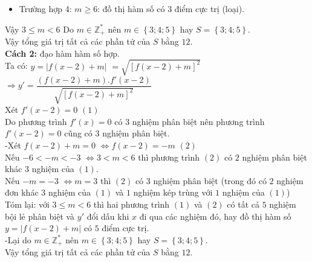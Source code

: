 \begin{ex}
{\begin{itemize}
		\item Trường hợp 4: $m\ge 6$: đồ thị hàm số có $3$ điểm cực trị (loại).
	\end{itemize}
	Vậy $3\le m<6$ Do $m\in\mathbb{Z}_+^*$ nên $m\in\left\{ 3;4;5\right\}$ hay $S=\left\{ 3;4;5\right\}$.\\
	Vậy tổng giá trị tất cả các phần tử của $S$ bằng $12$.\\
	\textbf{Cách 2:} đạo hàm hàm số hợp.\\
	Ta có: $y=\left|f\left(x-2\right)+m\right|$ $=\sqrt{\left[f\left(x-2\right)+m\right]^2}$ $\Rightarrow{y}'=\dfrac{\left(f\left(x-2\right)+m\right).f'\left(x-2\right)}{\sqrt{\left[f\left(x-2\right)+m\right]^2}}$\\
	Xét $f'\left(x-2\right)=0$ $(1)$\\
	Do phương trình $f'(x)=0$ có $3$ nghiệm phân biệt nên phương trình $f'\left(x-2\right)=0$ cũng có $3$ nghiệm phân biệt.\\
	-Xét $f\left(x-2\right)+m=0$ $\Leftrightarrow f\left(x-2\right)=-m$ $(2)$\\
	Nếu $-6<-m<-3$ $\Leftrightarrow 3<m<6$ thì phương trình $(2)$ có $2$ nghiệm phân biệt khác $3$ nghiệm của $(1)$.\\
	Nếu $-m=-3$ $\Leftrightarrow m=3$ thì $(2)$ có $3$ nghiệm phân biệt (trong đó có $2$ nghiệm đơn khác $3$ nghiệm của $(1)$ và $1$ nghiệm kép trùng với $1$ nghiệm của $(1)$)\\
	Tóm lại: với $3\le m<6$ thì hai phương trình $(1)$ và $(2)$ có tất cả $5$ nghiệm bội lẻ phân biệt và $y'$ đổi dấu khi $x$ đi qua các nghiệm đó, hay đồ thị hàm số $y=\left| f\left(x-2\right)+m\right|$ có $5$ điểm cực trị.\\
	-Lại do $m\in\mathbb{Z}_+^*$ nên $m\in\left\{ 3;4;5\right\}$ hay $S=\left\{3;4;5\right\}$.\\
	Vậy tổng giá trị tất cả các phần tử của $S$ bằng $12$.
}
\end{ex}
